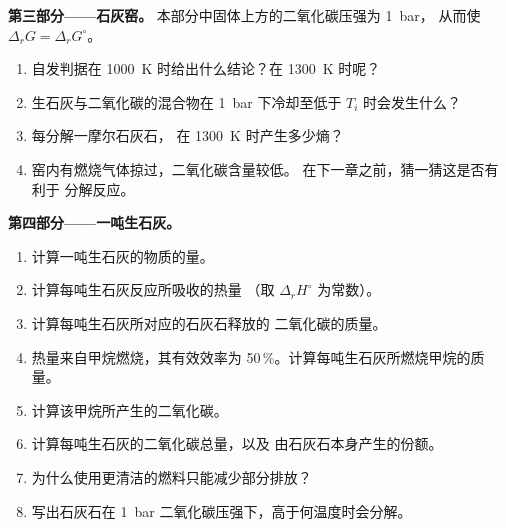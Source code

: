 \begin{problem}
\medskip
\noindent\textbf{第三部分——石灰窑。}
本部分中固体上方的二氧化碳压强为 \qty{1}{bar}，
从而使 $\Delta_r G = \Delta_r G^\circ$。
\begin{enumerate}[resume]
  \item 自发判据在 \qty{1000}{K} 时给出什么结论？在
        \qty{1300}{K} 时呢？
  \item 生石灰与二氧化碳的混合物在
        \qty{1}{bar} 下冷却至低于 $T_i$ 时会发生什么？
  \item 每分解一摩尔石灰石，
        在 \qty{1300}{K} 时产生多少熵？
  \item 窑内有燃烧气体掠过，二氧化碳含量较低。
        在下一章之前，猜一猜这是否有利于
        分解反应。
\end{enumerate}

\medskip
\noindent\textbf{第四部分——一吨生石灰。}
\begin{enumerate}[resume]
  \item 计算一吨生石灰的物质的量。
  \item 计算每吨生石灰反应所吸收的热量
        （取 $\Delta_r H^\circ$ 为常数）。
  \item 计算每吨生石灰所对应的石灰石释放的
        二氧化碳的质量。
  \item 热量来自甲烷燃烧，其有效效率为
        50\,\%。计算每吨生石灰所燃烧甲烷的质量。
  \item 计算该甲烷所产生的二氧化碳。
  \item 计算每吨生石灰的二氧化碳总量，以及
        由石灰石本身产生的份额。
  \item 为什么使用更清洁的燃料只能减少部分排放？
  \item 写出石灰石在
        \qty{1}{bar} 二氧化碳压强下，高于何温度时会分解。
\end{enumerate}
\end{problem}

